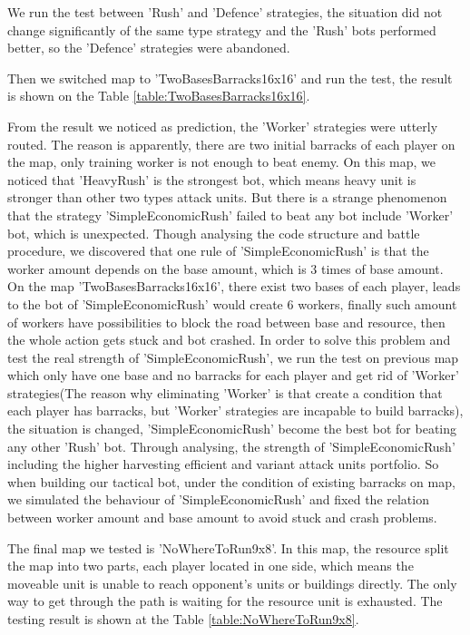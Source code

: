 We run the test between 'Rush' and 'Defence' strategies, the situation did not change significantly
of the same type strategy and the 'Rush' bots performed better, so the 'Defence' strategies were abandoned.

Then we switched map to 'TwoBasesBarracks16x16' and run the test, the result is shown on the
Table \ref{table:TwoBasesBarracks16x16}.



From the result we noticed as prediction, the 'Worker' strategies were utterly routed. The reason is
apparently, there are two initial barracks of each player on the map, only training worker is not enough
to beat enemy. On this map, we noticed that 'HeavyRush' is the strongest bot, which means heavy unit is
stronger than other two types attack units. But there is a strange phenomenon that the strategy
'SimpleEconomicRush' failed to beat any bot include 'Worker' bot, which is unexpected. Though analysing
the code structure and battle procedure, we discovered that one rule of 'SimpleEconomicRush' is that the
worker amount depends on the base amount, which is 3 times of base amount. On the map 'TwoBasesBarracks16x16',
there exist two bases of each player, leads to the bot of 'SimpleEconomicRush' would create 6 workers,
finally such amount of workers have possibilities to block the road between base and resource, then the
whole action gets stuck and bot crashed. In order to solve this problem and test the real strength of
'SimpleEconomicRush', we run the test on previous map which only have one base and no barracks for each
player and get rid of 'Worker' strategies(The reason why eliminating 'Worker' is that create a condition
that each player has barracks, but 'Worker' strategies are incapable to build barracks), the situation is
changed, 'SimpleEconomicRush' become the best bot for beating any other 'Rush' bot. Through analysing, the
strength of 'SimpleEconomicRush' including the higher harvesting efficient and variant attack units portfolio.
So when building our tactical bot, under the condition of existing barracks on map, we simulated the
behaviour of 'SimpleEconomicRush' and fixed the relation between worker amount and base amount to avoid
stuck and crash problems.

The final map we tested is 'NoWhereToRun9x8'. In this map, the resource split the map into two parts,
each player located in one side, which means the moveable unit is unable to reach opponent's units or
buildings directly. The only way to get through the path is waiting for the resource unit is exhausted.
The testing result is shown at the Table \ref{table:NoWhereToRun9x8}.


